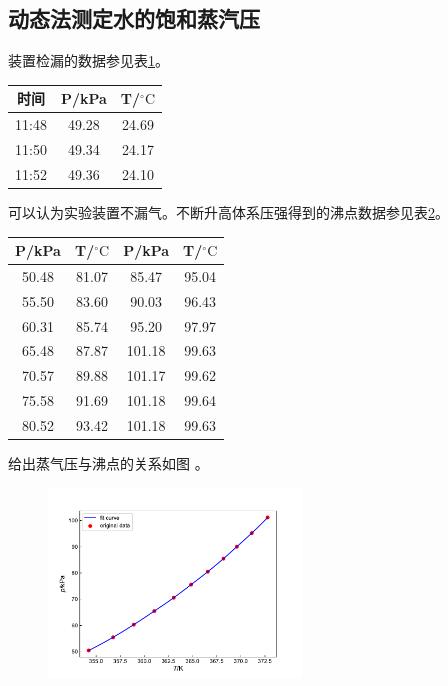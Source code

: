 \documentclass[12pt]{article}
\newcommand{\mr}[1]{\mathrm{#1}}
\def\celsius{^{\circ}\mr{C}}  %
\begin{document}
 		\subsection{动态法测定水的饱和蒸汽压}
		 装置检漏的数据参见表\ref{dynamic detection}。
		\begin{table}[h]
			\centering
			\begin{tabular}{ccc}
				\toprule
				时间 & P/kPa & T/$\celsius$ \\
				\midrule
				11:48 & 49.28 & 24.69  \\
				11:50 & 49.34 & 24.17  \\
				11:52 & 49.36 & 24.10  \\
				\bottomrule
			\end{tabular}
			\label{dynamic detection}
		\end{table}
		可以认为实验装置不漏气。不断升高体系压强得到的沸点数据参见表\ref{dynamic H2O}。
		\begin{table}[h]
			\centering
			\begin{tabular}{cccc}
				\toprule
				P/kPa & T/$\celsius$ & P/kPa & T/$\celsius$\\
				\midrule
				50.48 & 81.07 & 85.47 & 95.04  \\
				55.50 & 83.60 & 90.03 & 96.43  \\
				60.31 & 85.74 & 95.20 & 97.97  \\
				65.48 & 87.87 & 101.18 & 99.63 \\
				70.57 & 89.88 & 101.17 & 99.62 \\
				75.58 & 91.69 & 101.18 & 99.64 \\
				80.52 & 93.42 & 101.18 & 99.63 \\
				\bottomrule
			\end{tabular}
			\label{dynamic H2O}
		\end{table}
		给出蒸气压与沸点的关系如图 。
		\begin{figure}[h]
			\centering
			\includegraphics[width=0.6\textwidth]{water_spline.pdf}
			\label{P-T spline of H2O}
		\end{figure}
\end{document}

